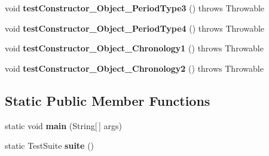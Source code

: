 \begin{DoxyCompactItemize}
\item 
\hypertarget{classorg_1_1joda_1_1time_1_1_test_mutable_period___constructors_a295d942e964c303616705bb400673d39}{void {\bfseries test\-Constructor\-\_\-\-Object\-\_\-\-Period\-Type3} ()  throws Throwable }\label{classorg_1_1joda_1_1time_1_1_test_mutable_period___constructors_a295d942e964c303616705bb400673d39}

\item 
\hypertarget{classorg_1_1joda_1_1time_1_1_test_mutable_period___constructors_ac83330659493b6900520c0a9eee3ff12}{void {\bfseries test\-Constructor\-\_\-\-Object\-\_\-\-Period\-Type4} ()  throws Throwable }\label{classorg_1_1joda_1_1time_1_1_test_mutable_period___constructors_ac83330659493b6900520c0a9eee3ff12}

\item 
\hypertarget{classorg_1_1joda_1_1time_1_1_test_mutable_period___constructors_a9db1222a80f8c204203abc2a64cbf35f}{void {\bfseries test\-Constructor\-\_\-\-Object\-\_\-\-Chronology1} ()  throws Throwable }\label{classorg_1_1joda_1_1time_1_1_test_mutable_period___constructors_a9db1222a80f8c204203abc2a64cbf35f}

\item 
\hypertarget{classorg_1_1joda_1_1time_1_1_test_mutable_period___constructors_af157a2ccfd063e082ab5b6db01da749c}{void {\bfseries test\-Constructor\-\_\-\-Object\-\_\-\-Chronology2} ()  throws Throwable }\label{classorg_1_1joda_1_1time_1_1_test_mutable_period___constructors_af157a2ccfd063e082ab5b6db01da749c}

\end{DoxyCompactItemize}
\subsection*{Static Public Member Functions}
\begin{DoxyCompactItemize}
\item 
\hypertarget{classorg_1_1joda_1_1time_1_1_test_mutable_period___constructors_a12d5c53a141f952557eca1e23f652ec9}{static void {\bfseries main} (String\mbox{[}$\,$\mbox{]} args)}\label{classorg_1_1joda_1_1time_1_1_test_mutable_period___constructors_a12d5c53a141f952557eca1e23f652ec9}

\item 
\hypertarget{classorg_1_1joda_1_1time_1_1_test_mutable_period___constructors_a08a99d6515c139bb089917e070fd3995}{static Test\-Suite {\bfseries suite} ()}\label{classorg_1_1joda_1_1time_1_1_test_mutable_period___constructors_a08a99d6515c139bb089917e070fd3995}

\end{DoxyCompactItemize}

